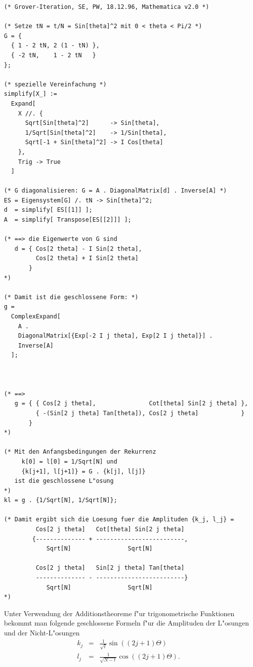          \begin{center}{\small 
         \begin{verbatim}
(* Grover-Iteration, SE, PW, 18.12.96, Mathematica v2.0 *)

(* Setze tN = t/N = Sin[theta]^2 mit 0 < theta < Pi/2 *)
G = {
  { 1 - 2 tN, 2 (1 - tN) },
  { -2 tN,    1 - 2 tN   }
};

(* spezielle Vereinfachung *)
simplify[X_] :=
  Expand[
    X //. {
      Sqrt[Sin[theta]^2]      -> Sin[theta],
      1/Sqrt[Sin[theta]^2]    -> 1/Sin[theta],
      Sqrt[-1 + Sin[theta]^2] -> I Cos[theta]
    },
    Trig -> True
  ]

(* G diagonalisieren: G = A . DiagonalMatrix[d] . Inverse[A] *)
ES = Eigensystem[G] /. tN -> Sin[theta]^2; 
d  = simplify[ ES[[1]] ];
A  = simplify[ Transpose[ES[[2]]] ];

(* ==> die Eigenwerte von G sind 
   d = { Cos[2 theta] - I Sin[2 theta], 
         Cos[2 theta] + I Sin[2 theta]
       } 
*)

(* Damit ist die geschlossene Form: *)
g = 
  ComplexExpand[
    A . 
    DiagonalMatrix[{Exp[-2 I j theta], Exp[2 I j theta]}] . 
    Inverse[A]
  ];



(* ==> 
   g = { { Cos[2 j theta],               Cot[theta] Sin[2 j theta] },
         { -(Sin[2 j theta] Tan[theta]), Cos[2 j theta]            }
       }
*)

(* Mit den Anfangsbedingungen der Rekurrenz
     k[0] = l[0] = 1/Sqrt[N] und
     {k[j+1], l[j+1]} = G . {k[j], l[j]}
   ist die geschlossene L"osung
*)
kl = g . {1/Sqrt[N], 1/Sqrt[N]};

(* Damit ergibt sich die Loesung fuer die Amplituden {k_j, l_j} =
         Cos[2 j theta]   Cot[theta] Sin[2 j theta]
        {-------------- + -------------------------, 
            Sqrt[N]                Sqrt[N]
 
         Cos[2 j theta]   Sin[2 j theta] Tan[theta]
         -------------- - -------------------------}
            Sqrt[N]                Sqrt[N]
*)
         \end{verbatim} } \end{center}
         Unter Verwendung der Additionstheoreme f"ur trigonometrische Funktionen bekommt man folgende geschlossene Formeln f"ur die Amplituden der L"osungen und
         der Nicht-L"osungen 
         \begin{eqnarray*} 
           k_{j} & = & \frac{1}{\sqrt{t}}\sin\left(\left( 2j + 1\right)\Theta\right) \\ 
           l_{j} & = & \frac{1}{\sqrt{N-t}}\cos\left(\left( 2j + 1\right)\Theta\right) . 
         \end{eqnarray*} 
